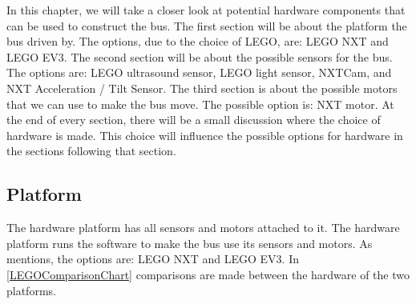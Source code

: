 In this chapter, we will take a closer look at potential hardware components that can be used to construct the bus. The first section will be about the platform the bus driven by. The options, due to the choice of LEGO, are: LEGO NXT and LEGO EV3.
The second section will be about the possible sensors for the bus. The options are: LEGO ultrasound sensor, LEGO light sensor, NXTCam\cite{Mindsensors}, and NXT Acceleration / Tilt Sensor\cite{HiTechnic}.
The third section is about the possible motors that we can use to make the bus move. The possible option is: NXT motor. 
At the end of every section, there will be a small discussion where the choice of hardware is made. This choice will influence the possible options for hardware in the sections following that section.

\subsection{Platform}

The hardware platform has all sensors and motors attached to it. The hardware platform runs the software to make the bus use its sensors and motors. As mentions, the options are: LEGO NXT and LEGO EV3. In \ref{LEGOComparisonChart} comparisons are made between the hardware of the two platforms.


